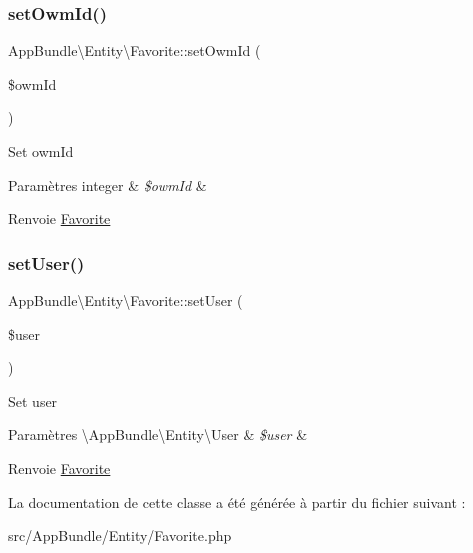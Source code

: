 \subsubsection{\texorpdfstring{set\+Owm\+Id()}{setOwmId()}}
{\footnotesize\ttfamily App\+Bundle\textbackslash{}\+Entity\textbackslash{}\+Favorite\+::set\+Owm\+Id (\begin{DoxyParamCaption}\item[{}]{\$owm\+Id }\end{DoxyParamCaption})}

Set owm\+Id


\begin{DoxyParams}[1]{Paramètres}
integer & {\em \$owm\+Id} & \\
\hline
\end{DoxyParams}
\begin{DoxyReturn}{Renvoie}
\hyperlink{classAppBundle_1_1Entity_1_1Favorite}{Favorite} 
\end{DoxyReturn}
\mbox{\label{classAppBundle_1_1Entity_1_1Favorite_a565975ee6c451fb15aad99e50746f907}} 
\subsubsection{\texorpdfstring{set\+User()}{setUser()}}
{\footnotesize\ttfamily App\+Bundle\textbackslash{}\+Entity\textbackslash{}\+Favorite\+::set\+User (\begin{DoxyParamCaption}\item[{\textbackslash{}\hyperlink{classAppBundle_1_1Entity_1_1User}{App\+Bundle\textbackslash{}\+Entity\textbackslash{}\+User}}]{\$user }\end{DoxyParamCaption})}

Set user


\begin{DoxyParams}[1]{Paramètres}
\textbackslash{}\+App\+Bundle\textbackslash{}\+Entity\textbackslash{}\+User & {\em \$user} & \\
\hline
\end{DoxyParams}
\begin{DoxyReturn}{Renvoie}
\hyperlink{classAppBundle_1_1Entity_1_1Favorite}{Favorite} 
\end{DoxyReturn}


La documentation de cette classe a été générée à partir du fichier suivant \+:\begin{DoxyCompactItemize}
\item 
src/\+App\+Bundle/\+Entity/Favorite.\+php\end{DoxyCompactItemize}
